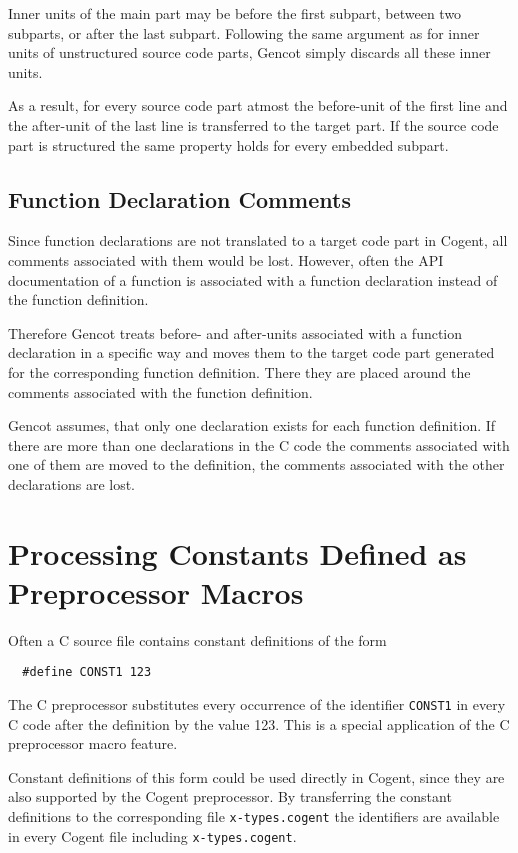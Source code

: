 \documentclass[a4paper]{report}
\newcommand{\code}[1]{\textnormal{\texttt{#1}}}
\begin{document}
Inner units of the main part may be before the first subpart, between two subparts, or after the last subpart. Following 
the same argument as for inner units of unstructured source code parts, Gencot simply discards all these inner units.

As a result, for every source code part atmost the before-unit of the first line and the after-unit of the last line 
is transferred to the target part. If the source code part is structured the same property holds for every embedded 
subpart.

\subsection{Function Declaration Comments}

Since function declarations are not translated to a target code part in Cogent, all comments associated with them would
be lost. However, often the API documentation of a function is associated with a function declaration instead of the
function definition. 

Therefore Gencot treats before- and after-units associated with a function declaration in a specific way and 
moves them to the target code part generated for the corresponding function definition. There they are placed around 
the comments associated with the function definition. 

Gencot assumes, that only one declaration exists for each function definition. If there are more than one declarations 
in the C code the comments associated with one of them are moved to the definition, the comments associated with
the other declarations are lost. 

\section{Processing Constants Defined as Preprocessor Macros}
\label{design-const}

Often a C source file contains constant definitions of the form
\begin{verbatim}
  #define CONST1 123
\end{verbatim}
The C preprocessor substitutes every occurrence of the identifier \code{CONST1} in every C code after the definition 
by the value 123. This is a special application of the C preprocessor macro feature.

Constant definitions of this form could be used directly in Cogent, since they are also supported by the Cogent preprocessor.
By transferring the constant definitions to the corresponding file \code{x-types.cogent} the identifiers are available
in every Cogent file including \code{x-types.cogent}. 
\end{document}
